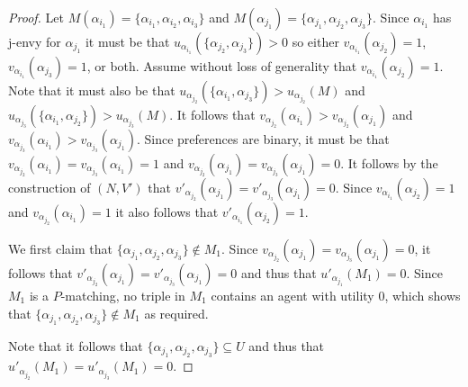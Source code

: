 \begin{proof}
Let $M(\alpha_{i_1}) = \{ \alpha_{i_1}, \alpha_{i_2}, \alpha_{i_3} \}$ and $M(\alpha_{j_1}) = \{ \alpha_{j_1}, \alpha_{j_2}, \alpha_{j_3} \}$. Since $\alpha_{i_1}$ has j-envy for $\alpha_{j_1}$ it must be that $u_{\alpha_{i_1}}(\{ \alpha_{j_2}, \alpha_{j_3} \}) > 0$ so either $v_{\alpha_{i_1}}(\alpha_{j_2})=1$, $v_{\alpha_{i_1}}(\alpha_{j_3})=1$, or both. Assume without loss of generality that $v_{\alpha_{i_1}}(\alpha_{j_2})=1$. Note that it must also be that $u_{\alpha_{j_2}}(\{ \alpha_{i_1}, \alpha_{j_3} \}) > u_{\alpha_{j_2}}(M)$ and $u_{\alpha_{j_3}}(\{ \alpha_{i_1}, \alpha_{j_2} \}) > u_{\alpha_{j_3}}(M)$. It follows that $v_{\alpha_{j_2}}(\alpha_{i_1}) > v_{\alpha_{j_2}}(\alpha_{j_1})$ and $v_{\alpha_{j_3}}(\alpha_{i_1}) > v_{\alpha_{j_3}}(\alpha_{j_1})$. Since preferences are binary, it must be that $v_{\alpha_{j_2}}(\alpha_{i_1})=v_{\alpha_{j_3}}(\alpha_{i_1})=1$ and $v_{\alpha_{j_2}}(\alpha_{j_1})=v_{\alpha_{j_3}}(\alpha_{j_1})=0$. It follows by the construction of $(N, V')$ that $\mathit{v'}_{\alpha_{j_2}}(\alpha_{j_1})=\mathit{v'}_{\alpha_{j_3}}(\alpha_{j_1})=0$. Since $v_{\alpha_{i_1}}(\alpha_{j_2})=1$ and $v_{\alpha_{j_2}}(\alpha_{i_1})=1$ it also follows that $\mathit{v'}_{\alpha_{i_1}}(\alpha_{j_2})=1$.

We first claim that $\{ \alpha_{j_1}, \alpha_{j_2}, \alpha_{j_3} \} \notin M_1$. Since $v_{\alpha_{j_2}}(\alpha_{j_1})=v_{\alpha_{j_3}}(\alpha_{j_1})=0$, it follows that $\mathit{v'}_{\alpha_{j_2}}(\alpha_{j_1})=\mathit{v'}_{\alpha_{j_3}}(\alpha_{j_1})=0$ and thus that $u'_{\alpha_{j_1}}(M_1)=0$. Since $M_1$ is a $P$\nobreakdash-matching, no triple in $M_1$ contains an agent with utility $0$, which shows that $\{ \alpha_{j_1}, \alpha_{j_2}, \alpha_{j_3} \}\notin M_1$ as required. 

Note that it follows that $\{ \alpha_{j_1}, \alpha_{j_2}, \alpha_{j_3} \} \subseteq U$ and thus that $u'_{\alpha_{j_2}}(M_1)=u'_{\alpha_{j_3}}(M_1)=0$.


\end{proof}
